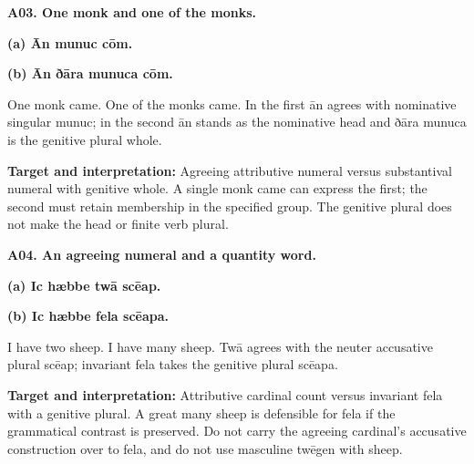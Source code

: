 \par\begin{minipage}{\linewidth}\raggedright
\textbf{A03. One monk and one of the monks.}

\textbf{(a) Ān munuc cōm.}

\textbf{(b) Ān ðāra munuca cōm.}

One monk came. One of the monks came. In the first ān agrees with nominative singular munuc; in the second ān stands as the nominative head and ðāra munuca is the genitive plural whole.

\textbf{Target and interpretation:} Agreeing attributive numeral versus substantival numeral with genitive whole. A single monk came can express the first; the second must retain membership in the specified group. The genitive plural does not make the head or finite verb plural.

\end{minipage}\par\addvspace{4pt}

\par\begin{minipage}{\linewidth}\raggedright
\textbf{A04. An agreeing numeral and a quantity word.}

\textbf{(a) Ic hæbbe twā scēap.}

\textbf{(b) Ic hæbbe fela scēapa.}

I have two sheep. I have many sheep. Twā agrees with the neuter accusative plural scēap; invariant fela takes the genitive plural scēapa.

\textbf{Target and interpretation:} Attributive cardinal count versus invariant fela with a genitive plural. A great many sheep is defensible for fela if the grammatical contrast is preserved. Do not carry the agreeing cardinal’s accusative construction over to fela, and do not use masculine twēgen with sheep.

\end{minipage}\par\addvspace{4pt}

